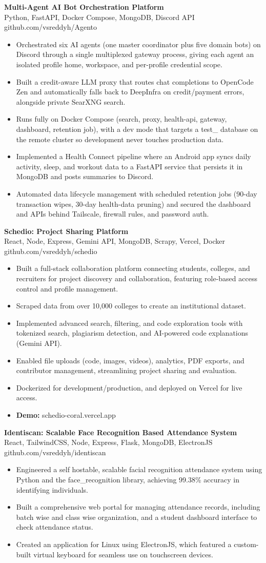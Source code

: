 \documentclass[a4paper,11pt]{article}
\newcommand{\resumeItem}[1]{\item \small{#1}}
\newcommand{\resumeSubheading}[4]{%
  \textbf{#1} \hfill \textbf{#2} \\
{#3} \hfill {#4}
}
\newcommand{\resumeSubHeadingListStart}{\begin{itemize}}
\newcommand{\resumeSubHeadingListEnd}{\end{itemize}}
\begin{document}
\resumeSubheading
{Multi-Agent AI Bot Orchestration Platform}{}{Python, FastAPI, Docker Compose, MongoDB, Discord API}{github.com/vsreddyh/Agento}
\resumeSubHeadingListStart
\resumeItem{Orchestrated six AI agents (one master coordinator plus five domain bots) on Discord through a single multiplexed gateway process, giving each agent an isolated profile home, workspace, and per-profile credential scope.}
\resumeItem{Built a credit-aware LLM proxy that routes chat completions to OpenCode Zen and automatically falls back to DeepInfra on credit/payment errors, alongside private SearXNG search.}
\resumeItem{Runs fully on Docker Compose (search, proxy, health-api, gateway, dashboard, retention job), with a dev mode that targets a test\_ database on the remote cluster so development never touches production data.}
\resumeItem{Implemented a Health Connect pipeline where an Android app syncs daily activity, sleep, and workout data to a FastAPI service that persists it in MongoDB and posts summaries to Discord.}
\resumeItem{Automated data lifecycle management with scheduled retention jobs (90-day transaction wipes, 30-day health-data pruning) and secured the dashboard and APIs behind Tailscale, firewall rules, and password auth.}
\resumeSubHeadingListEnd

\resumeSubheading
{Schedio: Project Sharing Platform}{}{React, Node, Express, Gemini API, MongoDB, Scrapy, Vercel, Docker}{github.com/vsreddyh/schedio}
\resumeSubHeadingListStart
\resumeItem{Built a full-stack collaboration platform connecting students, colleges, and recruiters for project discovery and collaboration, featuring role-based access control and profile management.}
\resumeItem{Scraped data from over 10,000 colleges to create an institutional dataset.}
\resumeItem{Implemented advanced search, filtering, and code exploration tools with tokenized search, plagiarism detection, and AI-powered code explanations (Gemini API).}
\resumeItem{Enabled file uploads (code, images, videos), analytics, PDF exports, and contributor management, streamlining project sharing and evaluation.}
\resumeItem{Dockerized for development/production, and deployed on Vercel for live access.}
\resumeItem{\textbf{Demo:} schedio-coral.vercel.app}
\resumeSubHeadingListEnd

\resumeSubheading{Identiscan: Scalable Face Recognition Based Attendance System}{}{React, TailwindCSS, Node, Express, Flask, MongoDB, ElectronJS}{github.com/vsreddyh/identiscan}
\resumeSubHeadingListStart
\resumeItem{Engineered a self hostable, scalable facial recognition attendance system using Python and the face\_recognition library, achieving 99.38\% accuracy in identifying individuals.}
  \resumeItem{Built a comprehensive web portal for managing attendance records, including batch wise and class wise organization, and a student dashboard interface to check attendance status.}
  \resumeItem{Created an application for Linux using ElectronJS, which featured a custom-built virtual keyboard for seamless use on touchscreen devices.}
\resumeSubHeadingListEnd
\end{document}
